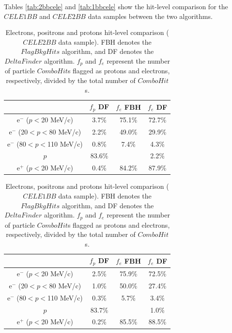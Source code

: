 Tables \ref{tab:2bbcele} and \ref{tab:1bbcele} show the hit-level 
comparison for the $CELE1BB$ and $CELE2BB$ data samples between the two algorithms.
\begin{center}
    \begin{table}[h!]
    \centering
    \renewcommand{\arraystretch}{1.}
    \begin{tabular}{| c | c | c | c |} 
    \hline
    &    $f_{p}$ DF & $f_{e}$ FBH  & $f_{e}$ DF \\
    \hline
    e$^-$ ($p<$20 MeV/c)      & 3.7\%   & 75.1\% & 72.7\%\\
    \hline
    e$^-$ (20$<p<$80 MeV/c)  & 2.2\%   & 49.0\%& 29.9\%\\
    \hline
    e$^-$ (80$<p<$110 MeV/c)  & 0.8\%  &  7.4\%& 4.3\%\\
    \hline
    $p$       &  83.6\%  &  & 2.2\%\\
    \hline
    e$^+$ ($p<$20 MeV/c) & 0.4\%    &   84.2\%& 87.9\%\\
    \hline
    \end{tabular}
    \caption[Electrons, 
    positrons and protons hit-level comparison.]{Electrons, 
    positrons and protons hit-level comparison ($CELE2BB$ data sample). FBH denotes 
    the $FlagBkgHits$ algorithm, and DF denotes the $DeltaFinder$ algorithm. $f_p$ and $f_e$ represent 
    the number of particle $ComboHit$s flagged as protons and electrons, respectively, 
    divided by the total number of $ComboHit$s.
    }
    \end{table}\label{tab:2bbcele}
    \end{center}

    \begin{center}
    \begin{table}[h!]
    \centering
    \renewcommand{\arraystretch}{1.}
    \begin{tabular}{| c | c | c | c |} 
    \hline
   &  $f_{p}$ DF & $f_{e}$ FBH  & $f_{e}$ DF \\
    \hline
    e$^-$ ($p<$20 MeV/c)     & 2.5\%   & 75.9\% & 72.5\%\\
    \hline
    e$^-$ (20$<p<$80 MeV/c)  & 1.0\%   & 50.0\%& 27.4\%\\
    \hline
    e$^-$ (80$<p<$110 MeV/c)   & 0.3\%  &  5.7\%& 3.4\%\\
    \hline
    $p$                 &         83.7\%   &  & 1.0\%\\
    \hline
    e$^+$ ($p<$20 MeV/c)    & 0.2\%    &   85.5\%& 88.5\%\\
    \hline
    \end{tabular}
    \caption[Electrons, positrons and protons hit-level comparison.]{Electrons, 
    positrons and protons hit-level comparison ($CELE1BB$ data sample). FBH denotes 
    the $FlagBkgHits$ algorithm, and DF denotes the $DeltaFinder$ algorithm. $f_p$ and $f_e$ represent 
    the number of particle $ComboHit$s flagged as protons and electrons, respectively, 
    divided by the total number of $ComboHit$s.}
    \end{table}\label{tab:1bbcele}
    \end{center}
  
